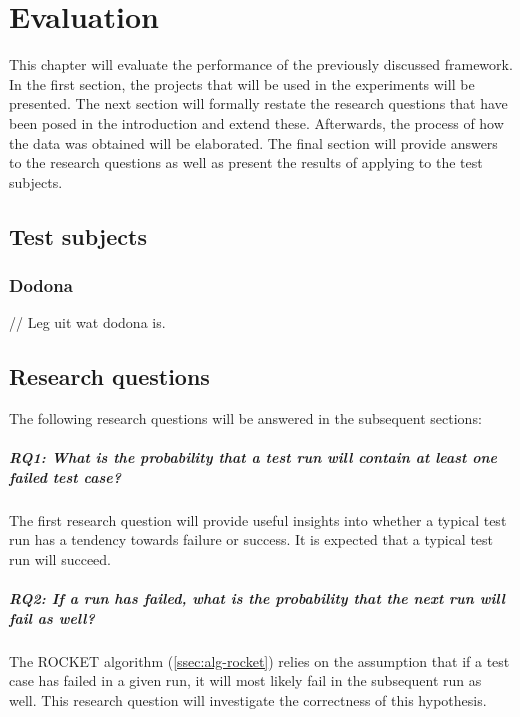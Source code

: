 
\chapter{Evaluation}\label{chap:evaluation}
This chapter will evaluate the performance of the previously discussed \velocity{} framework. In the first section, the projects that will be used in the experiments will be presented. The next section will formally restate the research questions that have been posed in the introduction and extend these. Afterwards, the process of how the data was obtained will be elaborated. The final section will provide answers to the research questions as well as present the results of applying \tcp{} to the test subjects.

\section{Test subjects}

\subsection{Dodona}
// Leg uit wat dodona is.


\section{Research questions}
The following research questions will be answered in the subsequent sections:

\paragraph*{RQ1: What is the probability that a test run will contain at least one failed test case?}
The first research question will provide useful insights into whether a typical test run has a tendency towards failure or success. It is expected that a typical test run will succeed.

\paragraph*{RQ2: If a run has failed, what is the probability that the next run will fail as well?}
The ROCKET algorithm (\autoref{ssec:alg-rocket}) relies on the assumption that if a test case has failed in a given run, it will most likely fail in the subsequent run as well. This research question will investigate the correctness of this hypothesis.

